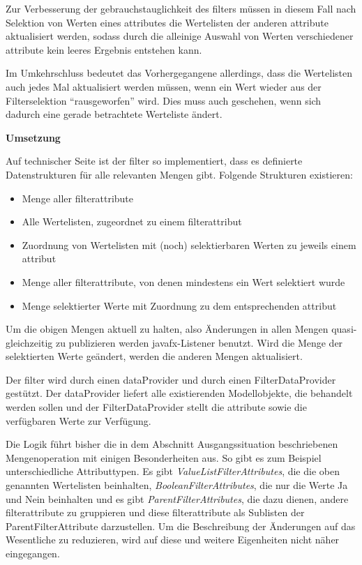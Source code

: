 Zur Verbesserung der \gls{gebrauchstauglichkeit} des \gls{filter}s müssen in diesem Fall nach Selektion von Werten eines \gls{attribut}es die Wertelisten der anderen \gls{attribut}e aktualisiert werden, sodass durch die alleinige Auswahl von Werten verschiedener \gls{attribut}e kein leeres Ergebnis entstehen kann.

Im Umkehrschluss bedeutet das Vorhergegangene allerdings, dass die Wertelisten auch jedes Mal aktualisiert werden müssen, wenn ein Wert wieder aus der Filterselektion \enquote{rausgeworfen} wird. Dies muss auch geschehen, wenn sich dadurch eine gerade betrachtete Werteliste ändert.

\textbf{Umsetzung}

Auf technischer Seite ist der \gls{filter} so implementiert, dass es definierte Datenstrukturen für alle relevanten Mengen gibt. Folgende Strukturen existieren:

\begin{itemize}
	\item Menge aller \gls{filterattribut}e
	\item Alle Wertelisten, zugeordnet zu einem \gls{filterattribut}
	\item Zuordnung von Wertelisten mit (noch) selektierbaren Werten zu jeweils einem \gls{attribut}
	\item Menge aller \gls{filterattribut}e, von denen mindestens ein Wert selektiert wurde
	\item Menge selektierter Werte mit Zuordnung zu dem entsprechenden \gls{attribut}
\end{itemize}

Um die obigen Mengen aktuell zu halten, also Änderungen in allen Mengen quasi-gleichzeitig zu publizieren werden \gls{javafx}-Listener benutzt. Wird die Menge der selektierten Werte geändert, werden die anderen Mengen aktualisiert.

Der \gls{filter} wird durch einen \gls{dataProvider} und durch einen FilterDataProvider gestützt. Der \gls{dataProvider} liefert alle existierenden Modellobjekte, die behandelt werden sollen und der FilterDataProvider stellt die \gls{attribut}e sowie die verfügbaren Werte zur Verfügung.

Die Logik führt bisher die in dem Abschnitt Ausgangssituation beschriebenen Mengenoperation mit einigen Besonderheiten aus. So gibt es zum Beispiel unterschiedliche Attributtypen. Es gibt \textit{ValueListFilterAttributes}, die die oben genannten Wertelisten beinhalten, \textit{BooleanFilterAttributes}, die nur die Werte Ja und Nein beinhalten und es gibt \textit{ParentFilterAttributes}, die dazu dienen, andere \gls{filterattribut}e zu gruppieren und diese \gls{filterattribut}e als Sublisten der ParentFilterAttribute darzustellen. Um die Beschreibung der Änderungen auf das Wesentliche zu reduzieren, wird auf diese und weitere Eigenheiten nicht näher eingegangen.

